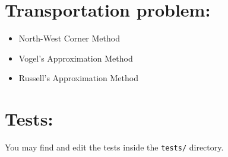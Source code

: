 \documentclass{article}
\begin{document}
\section*{Transportation problem:}

\begin{itemize}
    \item North-West Corner Method
    \item Vogel's Approximation Method
    \item Russell's Approximation Method
\end{itemize}

\newpage

\section*{Tests:}

You may find and edit the tests inside the \texttt{tests/} directory.
\end{document}
